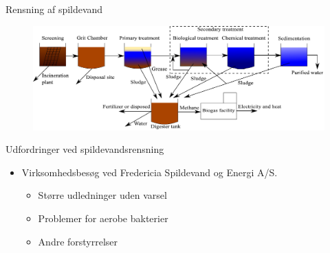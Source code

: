 

\begin{frame}{Rensning af spildevand}{}
\vfill\vfill\centering
\begin{figure}[H]
\centering
\includegraphics[width=1\textwidth,height=0.4\textwidth]{Sections/pictures/WWTP_overview.pdf}
\end{figure}
\vfill\vfill
\end{frame}
%


\begin{frame}{Udfordringer ved spildevandsrensning}{}
\vfill\vfill\centering
\begin{itemize}
	\item<1-> Virksomhedsbesøg ved Fredericia Spildevand og Energi A/S.
	
	\begin{itemize}
		\item<2-> Større udledninger uden varsel
		\vspace{2mm}
		\item<3-> Problemer for aerobe bakterier
		\vspace{2mm}
		\item<4-> Andre forstyrrelser
	\end{itemize}	

\end{itemize}
\vfill\vfill
\end{frame}

